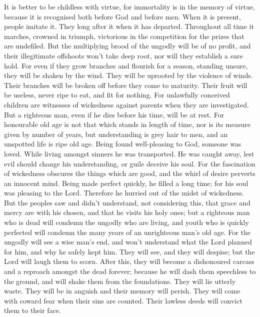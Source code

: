  It is better to be childless with virtue, for immortality
is in the memory of virtue, because it is recognised both before God and
before men.  When it is present, people imitate it. They
long after it when it has departed. Throughout all time it marches,
crowned in triumph, victorious in the competition for the prizes that
are undefiled.  But the multiplying brood of the ungodly
will be of no profit, and their illegitimate offshoots won't take deep
root, nor will they establish a sure hold.  For even if they
grow branches and flourish for a season, standing unsure, they will be
shaken by the wind. They will be uprooted by the violence of winds.
 Their branches will be broken off before they come to
maturity. Their fruit will be useless, never ripe to eat, and fit for
nothing.  For unlawfully conceived children are witnesses of
wickedness against parents when they are investigated.  But
a righteous man, even if he dies before his time, will be at rest.
 For honourable old age is not that which stands in length
of time, nor is its measure given by number of years,  but
understanding is grey hair to men, and an unspotted life is ripe old
age.  Being found well-pleasing to God, someone was loved.
While living amongst sinners he was transported.  He was
caught away, lest evil should change his understanding, or guile deceive
his soul.  For the fascination of wickedness obscures the
things which are good, and the whirl of desire perverts an innocent
mind.  Being made perfect quickly, he filled a long time;
 for his soul was pleasing to the Lord. Therefore he
hurried out of the midst of wickedness.  But the peoples
saw and didn't understand, not considering this, that grace and mercy
are with his chosen, and that he visits his holy ones;  but
a righteous man who is dead will condemn the ungodly who are living, and
youth who is quickly perfected will condemn the many years of an
unrighteous man's old age.  For the ungodly will see a wise
man's end, and won't understand what the Lord planned for him, and why
he safely kept him.  They will see, and they will despise;
but the Lord will laugh them to scorn. After this, they will become a
dishonoured carcass and a reproach amongst the dead forever;
 because he will dash them speechless to the ground, and
will shake them from the foundations. They will lie utterly waste. They
will be in anguish and their memory will perish.  They will
come with coward fear when their sins are counted. Their lawless deeds
will convict them to their face.

